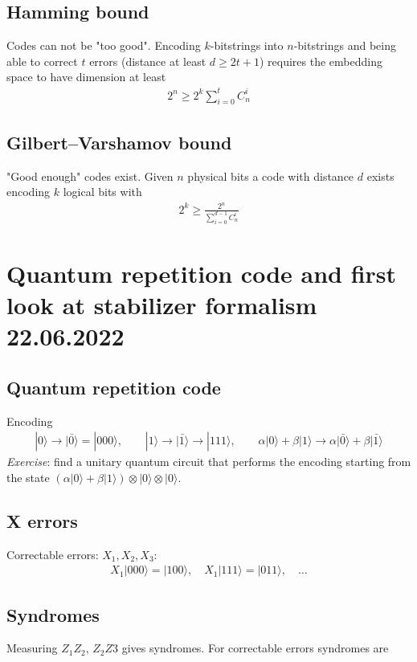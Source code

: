 \documentclass[12 pt]{article}
\begin{document}
\subsection{Hamming bound}
Codes can not be "too good". Encoding $k$-bitstrings into $n$-bitstrings and being able to correct $t$ errors (distance at least $d\ge2t+1$) requires the embedding space to have dimension at least
\begin{align}
2^n\ge 2^k \sum_{i=0}^t C_{n}^i
\end{align}
\subsection{Gilbert–Varshamov bound}
"Good enough" codes exist. Given $n$ physical bits a code with distance $d$ exists encoding $k$ logical bits with
\begin{align}
2^k\ge \frac{2^n}{\sum_{i=0}^{d-1} C_{n}^i}
\end{align}

\section{Quantum repetition code and first look at stabilizer formalism 22.06.2022}
\subsection{Quantum repetition code}
Encoding
\begin{align}
|0\rangle\to \bar{|0\rangle}=|000\rangle, \qquad |1\rangle\to\bar{|1\rangle}\to |111\rangle, \qquad \alpha|0\rangle+\beta |1\rangle\to\alpha\bar{|0\rangle}+\beta\bar{|1\rangle}
\end{align}
\textit{Exercise}: find a unitary quantum circuit that performs the encoding starting from the state $(\alpha|0\rangle+\beta|1\rangle)\otimes|0\rangle\otimes|0\rangle$.
\subsection{X errors}
Correctable errors: $X_1, X_2, X_3$:
\begin{align}
X_1|000\rangle=|100\rangle,\quad X_1|111\rangle=|011\rangle,\quad \dots
\end{align}
\subsection{Syndromes}
Measuring $Z_1Z_2$, $Z_2Z3$ gives syndromes. For correctable errors syndromes are
\end{document}
